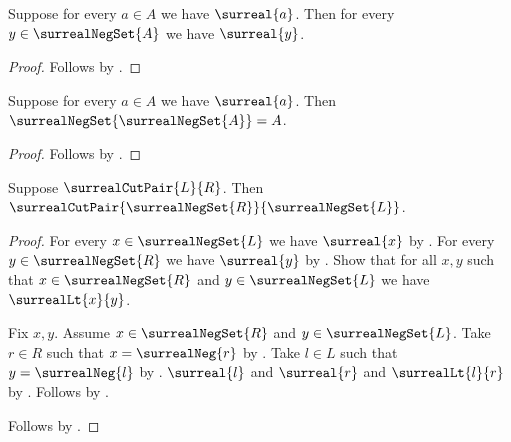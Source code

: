 \begin{proposition}\label{surreal_negation_set_surreal}
    Suppose for every $a\in A$ we have $\surreal{a}$.
    Then for every $y\in\surrealNegSet{A}$ we have $\surreal{y}$.
\end{proposition}
\begin{proof}
    Follows by .
\end{proof}

\begin{proposition}\label{surreal_negation_set_involutive}
    Suppose for every $a\in A$ we have $\surreal{a}$.
    Then $\surrealNegSet{\surrealNegSet{A}}=A$.
\end{proposition}
\begin{proof}
    Follows by .
\end{proof}

\begin{proposition}\label{surreal_negation_cut_pair}
    Suppose $\surrealCutPair{L}{R}$.
    Then $\surrealCutPair{\surrealNegSet{R}}{\surrealNegSet{L}}$.
\end{proposition}
\begin{proof}
    For every $x\in\surrealNegSet{L}$ we have $\surreal{x}$
        by .
    For every $y\in\surrealNegSet{R}$ we have $\surreal{y}$
        by .
    Show that for all $x,y$ such that
        $x\in\surrealNegSet{R}$ and $y\in\surrealNegSet{L}$
        we have $\surrealLt{x}{y}$.
    \begin{subproof}
        Fix $x,y$.
        Assume $x\in\surrealNegSet{R}$ and
            $y\in\surrealNegSet{L}$.
        Take $r\in R$ such that $x=\surrealNeg{r}$
            by .
        Take $l\in L$ such that $y=\surrealNeg{l}$
            by .
        $\surreal{l}$ and $\surreal{r}$ and $\surrealLt{l}{r}$
            by .
        Follows by .
    \end{subproof}
    Follows by .
\end{proof}

